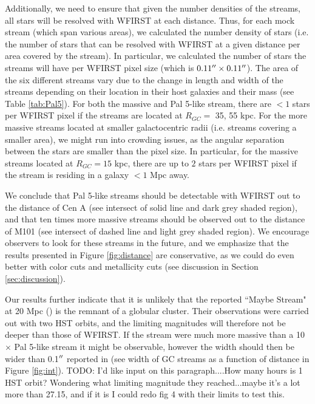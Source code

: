 \documentclass[twocolumn]{aastex62}
\newcommand{\todo}[1]{{\color{red} TODO: #1}}
\begin{document}
Additionally, we need to ensure that given the number densities of the streams, all stars will be resolved with WFIRST at each distance. Thus, for each mock stream (which span various areas), we calculated the number density of stars (i.e. the number of stars that can be resolved with WFIRST at a given distance per area covered by the stream). In particular, we calculated the number of stars the streams will have per WFIRST pixel size (which is $0.11\mbox{$^{\prime\prime}$} \times 0.11\mbox{$^{\prime\prime}$}$). The area of the six different streams vary due to the change in length and width of the streams depending on their location in their host galaxies and their mass (see Table \ref{tab:Pal5}). For both the massive and Pal 5-like stream, there are $<1$ stars per WFIRST pixel if the streams are located at $R_{GC} =$ 35, 55 kpc. For the more massive streams located at smaller galactocentric radii (i.e. streams covering a smaller area), we might run into crowding issues, as the angular separation between the stars are smaller than the pixel size. In particular, for the massive streams located at $R_{GC} = 15$ kpc, there are up to $2$ stars per WFIRST pixel if the stream is residing in a galaxy $< 1$ Mpc away. 

We conclude that Pal 5-like streams should be detectable with WFIRST out to the distance of Cen A (see intersect of solid line and dark grey shaded region), and that ten times more massive streams should be observed out to the distance of M101 (see intersect of dashed line and light grey shaded region). We encourage observers to look for these streams in the future, and we emphasize that the results presented in Figure \ref{fig:distance} are conservative, as we could do even better with color cuts and metallicity cuts (see discussion in Section \ref{sec:discussion}). 

Our results further indicate that it is unlikely that the reported ``Maybe Stream" at 20 Mpc (\citealt{abraham18}) is the remnant of a globular cluster. Their observations were carried out with two HST orbits, and the limiting magnitudes will therefore not be deeper than those of WFIRST. If the stream were much more massive than a 10 $\times$ Pal 5-like stream it might be observable, however the width should then be wider than 0.1$\mbox{$^{\prime\prime}$}$ reported in \citet{abraham18} (see width of GC streams as a function of distance in Figure \ref{fig:int}).  \todo{I'd like input on this paragraph....How many hours is 1 HST orbit? Wondering what limiting magnitude they reached...maybe it's a lot more than 27.15, and if it is I could redo fig 4 with their limits to test this.}
\end{document}
